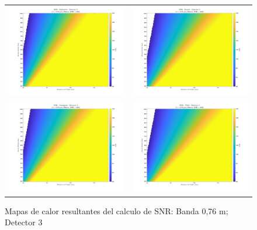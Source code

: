 \begin{landscape}
\begin{figure}[p]
\centering
\vspace*{0.3cm}

\vspace{0.3cm}
\setlength{\tabcolsep}{4pt}
\renewcommand{\arraystretch}{0}

\begin{tabular}{cc}
\includegraphics[width=0.48\linewidth]{4.Payload/SNR/SNR_Lambda3_Detector6_Telescopio1_heatmap.jpg} &
\includegraphics[width=0.48\linewidth]{4.Payload/SNR/SNR_Lambda3_Detector6_Telescopio2_heatmap.jpg} \\
\includegraphics[width=0.48\linewidth]{4.Payload/SNR/SNR_Lambda3_Detector6_Telescopio3_heatmap.jpg} &
\includegraphics[width=0.48\linewidth]{4.Payload/SNR/SNR_Lambda3_Detector6_Telescopio4_heatmap.jpg} \\
\end{tabular}
\caption{Mapas de calor resultantes del calculo de SNR: Banda 0,76 \textmu m; Detector 3}
\end{figure}
\end{landscape}


